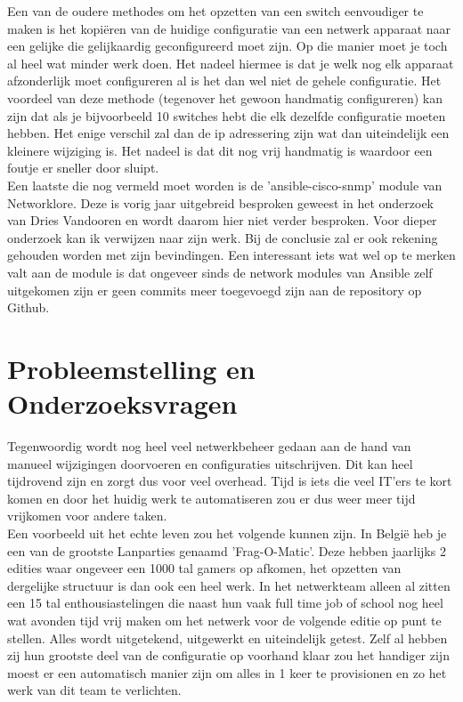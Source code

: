 Een van de oudere methodes om het opzetten van een switch eenvoudiger te maken is het kopiëren van de huidige configuratie van een netwerk apparaat naar een gelijke die gelijkaardig geconfigureerd moet zijn. Op die manier moet je toch al heel wat minder werk doen. Het nadeel hiermee is dat je welk nog elk apparaat afzonderlijk moet configureren al is het dan wel niet de gehele configuratie. Het voordeel van deze methode (tegenover het gewoon handmatig configureren) kan zijn dat als je bijvoorbeeld 10 switches hebt die elk dezelfde configuratie moeten hebben. Het enige verschil zal dan de ip adressering zijn wat dan uiteindelijk een kleinere wijziging is. Het nadeel is dat dit nog vrij handmatig is waardoor een foutje er sneller door sluipt.
\\

Een laatste die nog vermeld moet worden is de 'ansible-cisco-snmp' module van Networklore. Deze is vorig jaar uitgebreid besproken geweest in het onderzoek van Dries Vandooren en wordt daarom hier niet verder besproken. Voor dieper onderzoek kan ik verwijzen naar zijn werk. Bij de conclusie zal er ook rekening gehouden worden met zijn bevindingen. Een interessant iets wat wel op te merken valt aan de module is dat ongeveer sinds de network modules van Ansible zelf uitgekomen zijn er geen commits meer toegevoegd zijn aan de repository op Github.\autocite{driesVandooren}


\section{Probleemstelling en Onderzoeksvragen}
\label{sec:onderzoeksvragen}
Tegenwoordig wordt nog heel veel netwerkbeheer gedaan aan de hand van manueel wijzigingen doorvoeren en configuraties uitschrijven. Dit kan heel tijdrovend zijn en zorgt dus voor veel overhead. Tijd is iets die veel IT'ers te kort komen en door het huidig werk te automatiseren zou er dus weer meer tijd vrijkomen voor andere taken.
\\

Een voorbeeld uit het echte leven zou het volgende kunnen zijn.
In België heb je een van de grootste Lanparties genaamd 'Frag-O-Matic'. Deze hebben jaarlijks 2 edities waar ongeveer een 1000 tal gamers op afkomen, het opzetten van dergelijke structuur is dan ook een heel werk. In het netwerkteam alleen al zitten een 15 tal enthousiastelingen die naast hun vaak full time job of school nog heel wat avonden tijd vrij maken om het netwerk voor de volgende editie op punt te stellen. Alles wordt uitgetekend, uitgewerkt en uiteindelijk getest. Zelf al hebben zij hun grootste deel van de configuratie op voorhand klaar zou het handiger zijn moest er een automatisch manier zijn om alles in 1 keer te provisionen en zo het werk van dit team te verlichten. 
\\

